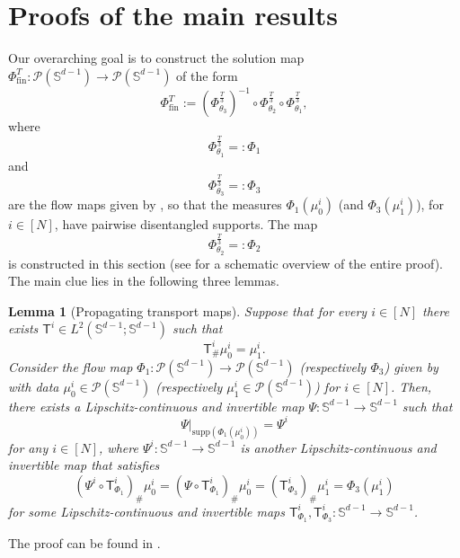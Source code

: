 \documentclass[a4paper,11pt]{article}
\theoremstyle{plain}
\newtheorem{lemma}[theorem]{Lemma}
\newcommand{\supp}{\mathrm{supp}}
\renewcommand{\S}{\mathbb{S}^{d-1}}
\numberwithin{equation}{section}
\begin{document}
\section{Proofs of the main results} \label{sec: proofs}

Our overarching goal is to construct the solution map $\Phi_{\mathrm{fin}}^T:\mathscr{P}(\S)\to\mathscr{P}(\S)$ of the form
$$\Phi_{\mathrm{fin}}^T:=\left(\Phi^{\frac{T}{3}}_{\theta_3}\right)^{-1}\circ \Phi^{\frac{T}{3}}_{\theta_2}\circ \Phi^{\frac{T}{3}}_{\theta_1}, 
$$
where $$\Phi_{\theta_1}^{\frac{T}{3}}=:\Phi_1$$ and 
$$\Phi_{\theta_3}^{\frac{T}{3}}=:\Phi_3$$ 
are the flow maps given by , so that the measures $\Phi_1(\mu_0^i)$ (and $\Phi_3(\mu_1^i)$), for $i\in[N]$, have pairwise disentangled supports. The map 
$$\Phi_{\theta_2}^{\frac{T}{3}}=:\Phi_2$$ 
is constructed in this section (see  for a schematic overview of the entire proof). The main clue lies in the following three lemmas.

\begin{lemma}[Propagating transport maps]
\label{lem: hyp.propagation}
Suppose that for every $i\in[N]$ there exists $\mathsf{T}^i\in L^2(\S;\S)$ such that
\begin{equation} \label{eq: hypothesis}
    \mathsf{T}^i_\#\mu_0^i=\mu_1^i.
\end{equation}
Consider the flow map $\Phi_1:\mathscr{P}(\S)\to\mathscr{P}(\S)$ (respectively $\Phi_3$) given by  with data $\mu_0^i\in\mathscr{P}(\S)$ (respectively $\mu_1^i\in\mathscr{P}(\S)$) for $i\in[N]$. 
Then, there exists a Lipschitz-continuous and invertible map $\Psi:\S\to\S$ such that
\begin{equation} \label{eq: diffeo.supports}
\Psi\big|_{\supp\left(\Phi_1(\mu_0^i)\right)}=\Psi^i
\end{equation}
for any $i\in[N]$, where $\Psi^i:\S\to\S$ is another Lipschitz-continuous and invertible map that satisfies
\begin{equation*}
\left(\Psi^i\circ \mathsf{T}^i_{\Phi_1}\right)_\#\mu_0^i= \left(\Psi\circ \mathsf{T}^i_{\Phi_1}\right)_\#\mu_0^i=\left(\mathsf{T}^i_{\Phi_3}\right)_\#\mu_1^i=\Phi_3(\mu_1^i)
\end{equation*}
for some Lipschitz-continuous and invertible maps $\mathsf{T}_{\Phi_1}^i, \mathsf{T}_{\Phi_3}^i:\S\to\S$.
\end{lemma}

The proof can be found in {\bf {}}.
\end{document}
